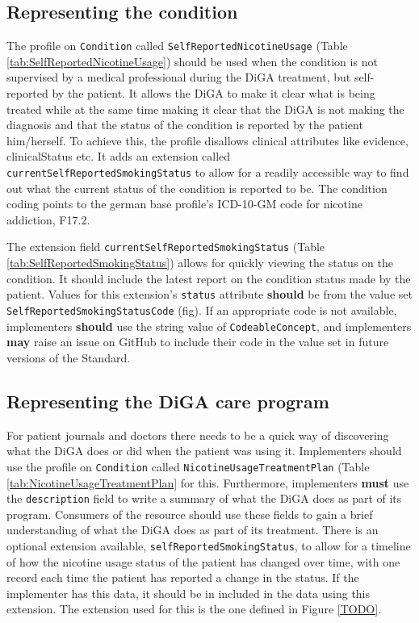 \documentclass[12px]{report}
\def\code#1{\texttt{#1}} %
\newcommand{\tabcondition}{}
\newcommand{\tabplan}{}
\newcommand{\tabstatusext}{}
\begin{document}


\subsection{Representing the condition}
\tabcondition

The profile on \code{Condition} called \code{SelfReportedNicotineUsage} (Table \ref{tab:SelfReportedNicotineUsage}) should be used when the condition is not supervised by a medical professional during the DiGA treatment, but self-reported by the patient.
It allows the DiGA to make it clear what is being treated while at the same time making it clear that the DiGA is not making the diagnosis and that the status of the condition is reported by the patient him/herself. 
To achieve this, the profile disallows clinical attributes like evidence, clinicalStatus etc. It adds an extension called \code{currentSelfReportedSmokingStatus} to allow for a readily accessible way to find out what the current status of the condition is reported to be. 
The condition coding points to the german base profile's \cite{debasis} ICD-10-GM code \cite{icd} for nicotine addiction, F17.2.


\tabstatusext
The extension field \code{currentSelfReportedSmokingStatus} (Table \ref{tab:SelfReportedSmokingStatus}) allows for quickly viewing the status on the condition. It should include the latest report on the condition status made by the patient.
Values for this extension's \code{status} attribute \textbf{should} be from the value set \code{SelfReportedSmokingStatusCode} (fig). If an appropriate code is not available, implementers \textbf{should} use the string value of \code{CodeableConcept}, 
and implementers \textbf{may} raise an issue on GitHub \cite{github} to include their code in the value set in future versions of the Standard.

\subsection{Representing the DiGA care program}
\tabplan
For patient journals and doctors there needs to be a quick way of discovering what the DiGA does or did when the patient was using it. 
Implementers should use the profile on \code{Condition} called \code{NicotineUsageTreatmentPlan} (Table \ref{tab:NicotineUsageTreatmentPlan} for this. 
Furthermore, implementers \textbf{must} use the \code{description} field to write a summary of what the DiGA does as part of its program.
Consumers of the resource should use these fields to gain a brief understanding of what the DiGA does as part of its treatment.
There is an optional extension available, \code{selfReportedSmokingStatus}, to allow for a timeline of how the nicotine usage status of the patient has changed over time, with one record each time the patient has reported a change in the status. 
If the implementer has this data, it should be in included in the data using this extension. The extension used for this is the one defined in Figure \ref{TODO}.
\end{document}

